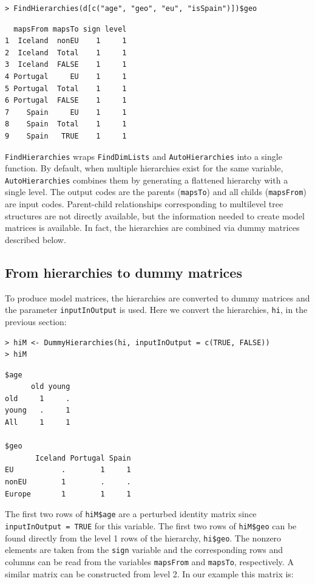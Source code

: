 \begin{verbatim}
> FindHierarchies(d[c("age", "geo", "eu", "isSpain")])$geo
\end{verbatim}

\begin{verbatim}
  mapsFrom mapsTo sign level
1  Iceland  nonEU    1     1
2  Iceland  Total    1     1
3  Iceland  FALSE    1     1
4 Portugal     EU    1     1
5 Portugal  Total    1     1
6 Portugal  FALSE    1     1
7    Spain     EU    1     1
8    Spain  Total    1     1
9    Spain   TRUE    1     1
\end{verbatim}

\texttt{FindHierarchies} wraps \texttt{FindDimLists} and \texttt{AutoHierarchies} into a single function.
By default, when multiple hierarchies exist for the same variable, \texttt{AutoHierarchies} combines them by generating a flattened hierarchy with a single level.
The output codes are the parents (\texttt{mapsTo}) and all childs (\texttt{mapsFrom}) are input codes.
Parent-child relationships corresponding to multilevel tree structures are not directly available,
but the information needed to create model matrices is available.
In fact, the hierarchies are combined via dummy matrices described below.

\hypertarget{from-hierarchies-to-dummy-matrices}{%
\subsection{From hierarchies to dummy matrices}\label{from-hierarchies-to-dummy-matrices}}

To produce model matrices, the hierarchies are converted to dummy matrices and the parameter \texttt{inputInOutput} is used.
Here we convert the hierarchies, \texttt{hi}, in the previous section:

\begin{verbatim}
> hiM <- DummyHierarchies(hi, inputInOutput = c(TRUE, FALSE))
> hiM
\end{verbatim}

\begin{verbatim}
$age
      old young
old     1     .
young   .     1
All     1     1

$geo
       Iceland Portugal Spain
EU           .        1     1
nonEU        1        .     .
Europe       1        1     1
\end{verbatim}

The first two rows of \texttt{hiM\$age} are a perturbed identity matrix since \texttt{inputInOutput\ =\ TRUE} for this variable.
The first two rows of \texttt{hiM\$geo} can be found directly from the level 1 rows of the hierarchy, \texttt{hi\$geo}.
The nonzero elements are taken from the \texttt{sign} variable and the corresponding rows and columns can be read from the variables \texttt{mapsFrom} and \texttt{mapsTo}, respectively.
A similar matrix can be constructed from level 2. In our example this matrix is:

